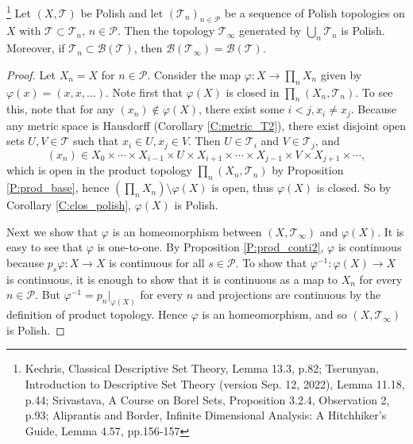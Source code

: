 \begin{lemma} \label{L:pol_union}
\footnote{
  Kechris, Classical Descriptive Set Theory, Lemma 13.3, p.82;
  Tserunyan, Introduction to Descriptive Set Theory (version Sep. 12,
  2022), Lemma 11.18, p.44; Srivastava, A Course on Borel Sets, 
  Proposition 3.2.4, Observation 2, p.93; 
  Aliprantis and Border, Infinite Dimensional Analysis: A Hitchhiker's 
  Guide, Lemma 4.57, pp.156-157}
Let $(X,\mathcal{T})$ be Polish and let $(\mathcal{T}_n)_{n\in \mathcal{P}}$
be a sequence of Polish topologies on $X$ with 
$\mathcal{T}\subset \mathcal{T}_n$, $n\in \mathcal{P}$. Then the topology
$\mathcal{T}_{\infty}$ generated by $\bigcup_n \mathcal{T}_n$ is Polish.
Moreover, if $\mathcal{T}_n\subset\mathcal{B}(\mathcal{T})$, then
$\mathcal{B}(\mathcal{T}_{\infty})=\mathcal{B}(\mathcal{T})$.
\end{lemma}
\begin{proof}
Let $X_n=X$ for $n\in\mathcal{P}$. Consider the map $\varphi:X\to \prod_n X_n$
given by $\varphi (x)=(x,x,\dots)$. Note first that $\varphi(X)$ is closed in
$\prod_n (X_n,\mathcal{T}_n)$. To see this, 
note that for any $(x_n)\notin \varphi(X)$, there exist some $i<j, x_i\neq x_j$.
Because any metric space is Hausdorff (Corollary \ref{C:metric_T2}),
there exist disjoint open sets $U,V\in \mathcal{T}$ such that 
$x_i\in U, x_j\in V$. Then $U\in\mathcal{T}_i$ and $V\in\mathcal{T}_j$, and
\[
  (x_n) \in 
    X_0 \times \cdots \times X_{i-1} \times U \times X_{i+1} \times \cdots
    \times X_{j-1} \times V \times X_{j+1} \times \cdots,
\]
which is open in the product topology $\prod_n (X_n,\mathcal{T}_n)$
by Proposition \ref{P:prod_base}, hence $(\prod_n X_n) \setminus \varphi(X)$ 
is open, thus $\varphi(X)$ is closed. So by Corollary \ref{C:clos_polish},
$\varphi(X)$ is Polish.

Next we show that $\varphi$ is an homeomorphism between 
$(X,\mathcal{T}_{\infty})$ and $\varphi(X)$. 
It is easy to see that $\varphi$ is one-to-one.
By Proposition \ref{P:prod_conti2}, $\varphi$ is continuous because 
$p_s \varphi:X\to X$ is continuous for all $s\in\mathcal{P}$.
To show that $\varphi^{-1}:\varphi(X)\to X$ is continuous, it is enough to
show that it is continuous as a map to $X_n$ for every $n\in\mathcal{P}$.
But $\varphi^{-1}=p_n|_{\varphi(X)}$ for every $n$ and projections are 
continuous by the definition of product topology.
Hence $\varphi$ is an homeomorphism, and so $(X,\mathcal{T}_{\infty})$ 
is Polish.
\end{proof}

